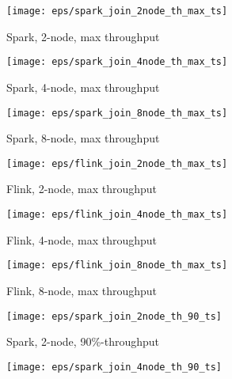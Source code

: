 {\begin{figure*}
    \centering
   \begin{subfigure}[b]{0.3\textwidth}
       \texttt{[image: eps/spark\_join\_2node\_th\_max\_ts]}

       \caption{Spark, 2-node, max  throughput}
       \label{fig_spark_join_2node_th_max_ts}
   \end{subfigure}%
   \begin{subfigure}[b]{0.3\textwidth}
       \texttt{[image: eps/spark\_join\_4node\_th\_max\_ts]}

       \caption{Spark, 4-node, max  throughput }
              \label{fig_spark_join_4node_th_max_ts}
   \end{subfigure}%
   \begin{subfigure}[b]{0.3\textwidth}
       \texttt{[image: eps/spark\_join\_8node\_th\_max\_ts]}

       \caption{Spark, 8-node, max  throughput }
              \label{fig_spark_join_8node_th_max_ts}
   \end{subfigure}




   \begin{subfigure}[b]{0.3\textwidth}
       \texttt{[image: eps/flink\_join\_2node\_th\_max\_ts]}

       \caption{Flink, 2-node, max  throughput}
   \end{subfigure}%
   \begin{subfigure}[b]{0.3\textwidth}
       \texttt{[image: eps/flink\_join\_4node\_th\_max\_ts]}

       \caption{Flink, 4-node, max  throughput }
   \end{subfigure}%
   \begin{subfigure}[b]{0.3\textwidth}
       \texttt{[image: eps/flink\_join\_8node\_th\_max\_ts]}

       \caption{Flink, 8-node, max  throughput }
   \end{subfigure}
   
   
   
   
      \begin{subfigure}[b]{0.3\textwidth}
       \texttt{[image: eps/spark\_join\_2node\_th\_90\_ts]}

       \caption{Spark, 2-node,  90\%-throughput}
   \end{subfigure}%
   \begin{subfigure}[b]{0.3\textwidth}
       \texttt{[image: eps/spark\_join\_4node\_th\_90\_ts]}


\end{subfigure}
\end{figure*}}
